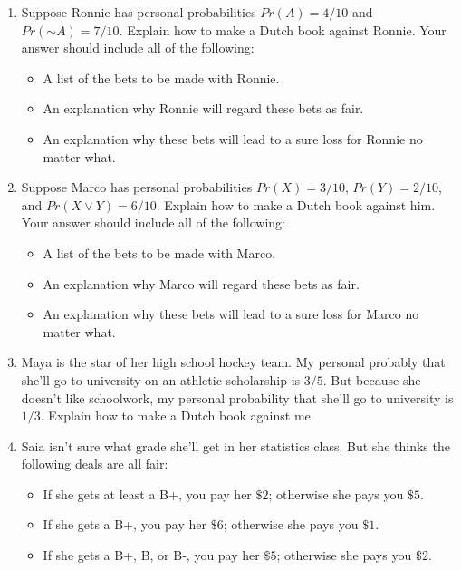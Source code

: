 \documentclass[justified]{tufte-book}
\providecommand{\tightlist}{%
  \setlength{\itemsep}{0pt}\setlength{\parskip}{0pt}}
\renewcommand{\neg}{\mathbin{\sim}}
\newcommand{\p}{Pr}
\theoremstyle{definition}
\theoremstyle{definition}
\theoremstyle{definition}
\theoremstyle{remark}
\begin{document}
\begin{enumerate}
\item
  Suppose Ronnie has personal probabilities \(\p(A) = 4/10\) and \(\p(\neg A) = 7/10\). Explain how to make a Dutch book against Ronnie. Your answer should include all of the following:

  \begin{itemize}
  \tightlist
  \item
    A list of the bets to be made with Ronnie.
  \item
    An explanation why Ronnie will regard these bets as fair.
  \item
    An explanation why these bets will lead to a sure loss for Ronnie no matter what.
  \end{itemize}
\item
  Suppose Marco has personal probabilities \(\p(X) = 3/10\), \(\p(Y) = 2/10\), and \(\p(X \vee Y) = 6/10\). Explain how to make a Dutch book against him. Your answer should include all of the following:

  \begin{itemize}
  \tightlist
  \item
    A list of the bets to be made with Marco.
  \item
    An explanation why Marco will regard these bets as fair.
  \item
    An explanation why these bets will lead to a sure loss for Marco no matter what.
  \end{itemize}
\item
  Maya is the star of her high school hockey team. My personal probably that she'll go to university on an athletic scholarship is \(3/5\). But because she doesn't like schoolwork, my personal probability that she'll go to university is \(1/3\). Explain how to make a Dutch book against me.
\item
  Saia isn't sure what grade she'll get in her statistics class. But she thinks the following deals are all fair:

  \begin{itemize}
  \tightlist
  \item
    If she gets at least a B+, you pay her \(\$2\); otherwise she pays you \(\$5\).
  \item
    If she gets a B+, you pay her \(\$6\); otherwise she pays you \(\$1\).
  \item
    If she gets a B+, B, or B-, you pay her \(\$5\); otherwise she pays you \(\$2\).
  \end{itemize}


\end{enumerate}
\end{document}
